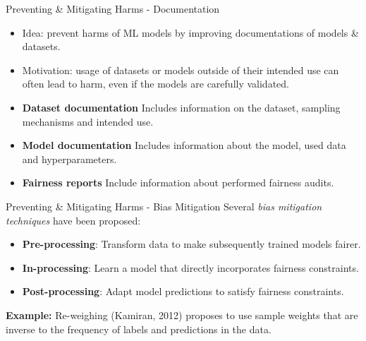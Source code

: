 \documentclass[11pt,compress,t,notes=noshow, xcolor=table]{beamer}
\begin{document}
\begin{vbframe}{Preventing \& Mitigating Harms - Documentation}

    \begin{itemize}
        \item Idea: prevent harms of ML models by improving documentations of models \& datasets.
        \vspace{5pt}
        
        \item Motivation: usage of datasets or models outside of their intended use can often lead to harm, even if the models are carefully validated.
        \vspace{5pt}
        
        \item \textbf{Dataset documentation} Includes information on the dataset, sampling mechanisms and intended use.
        \vspace{5pt}
        
        \item \textbf{Model documentation} Includes information about the model, used data and hyperparameters. 
        \vspace{5pt}
        
        \item \textbf{Fairness reports} Include information about performed fairness audits.

    \end{itemize}
\end{vbframe}

\begin{vbframe}{Preventing \& Mitigating Harms - Bias Mitigation}
    Several \emph{bias mitigation techniques} have been proposed:
    \begin{itemize}
        \item \textbf{Pre-processing}: Transform data to make subsequently trained models fairer.
        \vspace{10pt}
        
        \item \textbf{In-processing}: Learn a model that directly incorporates fairness constraints.
        \vspace{10pt}
        
        \item \textbf{Post-processing}: Adapt model predictions to satisfy fairness constraints.
        \vspace{10pt}
    \end{itemize}
    \textbf{Example:} Re-weighing (Kamiran, 2012) proposes to use sample weights that are inverse to the frequency of labels and predictions in the data.
\end{vbframe}
\end{document}
